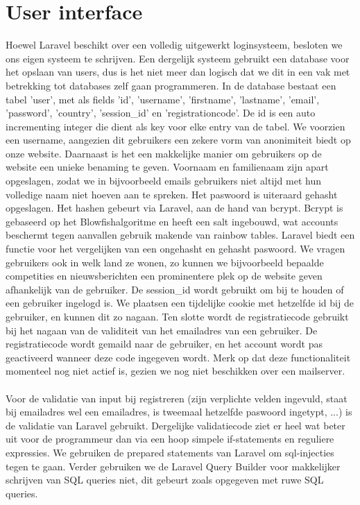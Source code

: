\documentclass[11pt, a4paper]{article}
\begin{document}
\section{User interface}

Hoewel Laravel beschikt over een volledig uitgewerkt loginsysteem, besloten we ons eigen systeem te schrijven. Een dergelijk systeem gebruikt een database voor het opslaan van users, dus is het niet meer dan logisch dat we dit in een vak met betrekking tot databases zelf gaan programmeren. In de database bestaat een tabel 'user', met als fields 'id', 'username', 'firstname', 'lastname', 'email', 'password', 'country', 'session\_id' en 'registrationcode'. De id is een auto incrementing integer die dient als key voor elke entry van de tabel. We voorzien een username, aangezien dit gebruikers een zekere vorm van anonimiteit biedt op onze website. Daarnaast is het een makkelijke manier om gebruikers op de website een unieke benaming te geven. Voornaam en familienaam zijn apart opgeslagen, zodat we in bijvoorbeeld emails gebruikers niet altijd met hun volledige naam niet hoeven aan te spreken. Het paswoord is uiteraard gehasht opgeslagen. Het hashen gebeurt via Laravel, aan de hand van bcrypt. Bcrypt is gebaseerd op het Blowfishalgoritme en heeft een salt ingebouwd, wat accounts beschermt tegen aanvallen gebruik makende van rainbow tables. Laravel biedt een functie voor het vergelijken van een ongehasht en gehasht paswoord. We vragen gebruikers ook in welk land ze wonen, zo kunnen we bijvoorbeeld bepaalde competities en nieuwsberichten een prominentere plek op de website geven afhankelijk van de gebruiker. De session\_id wordt gebruikt om bij te houden of een gebruiker ingelogd is. We plaatsen een tijdelijke cookie met hetzelfde id bij de gebruiker, en kunnen dit zo nagaan. Ten slotte wordt de registratiecode gebruikt bij het nagaan van de validiteit van het emailadres van een gebruiker. De registratiecode wordt gemaild naar de gebruiker, en het account wordt pas geactiveerd wanneer deze code ingegeven wordt. Merk op dat deze functionaliteit momenteel nog niet actief is, gezien we nog niet beschikken over een mailserver.
\\
\\
Voor de validatie van input bij registreren (zijn verplichte velden ingevuld, staat bij emailadres wel een emailadres, is tweemaal hetzelfde paswoord ingetypt, ...) is de validatie van Laravel gebruikt. Dergelijke validatiecode ziet er heel wat beter uit voor de programmeur dan via een hoop simpele if-statements en reguliere expressies. We gebruiken de prepared statements van Laravel om sql-injecties tegen te gaan. Verder gebruiken we de Laravel Query Builder voor makkelijker schrijven van SQL queries niet, dit gebeurt zoals opgegeven met ruwe SQL queries.
\end{document}

